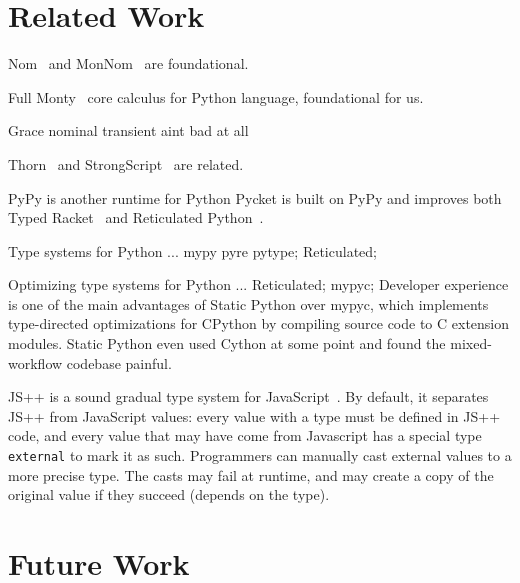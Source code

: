 \documentclass[english,cleveref,submission]{programming}
\newcommand{\SP}{Static Python}
\newcommand{\code}[1]{\texttt{#1}}
\begin{document}



\section{Related Work}
\label{s:related}

Nom~\cite{mt-oopsla-2017} and MonNom~\cite{mt-oopsla-2021} are foundational.

Full Monty~\cite{pmmwplck-oopsla-2013} core calculus for Python language, foundational for us.

Grace nominal transient aint bad at all

Thorn~\cite{wnlov-popl-2010} and StrongScript~\cite{rzv-ecoop-2015} are related.

PyPy is another runtime for Python
Pycket is built on PyPy and improves both Typed Racket~\cite{bbst-oopsla-2017}
and Reticulated Python~\cite{vsc-dls-2019}.

Type systems for Python ...
mypy pyre pytype;
Reticulated;

Optimizing type systems for Python ...
Reticulated;
mypyc;
Developer experience is one of the main advantages of \SP{} over mypyc,
which implements type-directed optimizations for CPython
by compiling source code to C extension modules.
\SP{} even used Cython at some point and found the mixed-workflow codebase painful.

JS++ is a sound gradual type system for JavaScript~\cite{jspp}.
By default, it separates JS++ from JavaScript values:
every value with a type must be defined in JS++ code,
and every value that may have come from Javascript has
a special type \code{external} to mark it as such.
Programmers can manually cast external values to a
more precise type.
The casts may fail at runtime, and may create a copy of
the original value if they succeed (depends on the type).


\section{Future Work}
\label{s:future}

\end{document}
